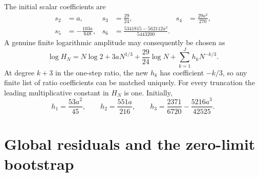 \documentclass[11pt,letterpaper]{article}
\numberwithin{equation}{section}
\theoremstyle{remark}
\begin{document}
The initial scalar coefficients are
\begin{equation}\label{air:dfa:eq:ratio-coefficients}
\begin{aligned}
s_2&=a,& s_3&=\frac{29}{24},& s_4&=\frac{29a^2}{270},\\
s_5&=-\frac{103a}{648},&
s_6&=\frac{5341815-562112a^3}{5443200}.
\end{aligned}
\end{equation}
A genuine finite logarithmic amplitude may consequently be chosen as
\begin{equation}\label{air:dfa:eq:H}
\log H_N=N\log2+3aN^{1/3}+\frac{29}{24}\log N
+\sum_{k=1}^{J}h_kN^{-k/3}.
\end{equation}
At degree $k+3$ in the one-step ratio, the new $h_k$ has coefficient $-k/3$,
so any finite list of ratio coefficients can be matched uniquely. For every
truncation the leading multiplicative constant in $H_N$ is one. Initially,
\begin{equation}\label{air:dfa:eq:h-coefficients}
h_1=\frac{53a^2}{45},\qquad h_2=\frac{551a}{216},\qquad
h_3=\frac{2371}{6720}-\frac{5216a^3}{42525}.
\end{equation}

\section{Global residuals and the zero-limit bootstrap}\label{air:dfa:sec:bootstrap}
\end{document}
